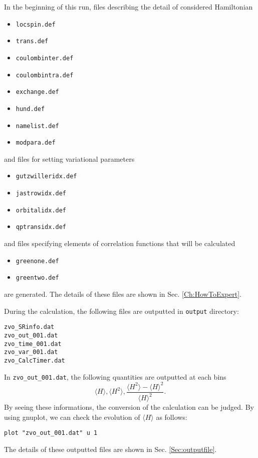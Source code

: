 In the beginning of this run,
files describing the detail of considered Hamiltonian
\begin{itemize}
\item \verb|locspin.def|
\item \verb|trans.def|
\item \verb|coulombinter.def|
\item \verb|coulombintra.def|
\item \verb|exchange.def|
\item \verb|hund.def|
\item \verb|namelist.def|
\item \verb|modpara.def|
\end{itemize}
and files for setting variational parameters
\begin{itemize}
\item \verb|gutzwilleridx.def|
\item \verb|jastrowidx.def|
\item \verb|orbitalidx.def|
\item \verb|qptransidx.def|
\end{itemize}
and files specifying elements of correlation functions
that will be calculated 
\begin{itemize}
\item \verb|greenone.def|
\item \verb|greentwo.def|
\end{itemize}
are generated. The details of these files are shown in Sec. \ref{Ch:HowToExpert}.

During the calculation, the following files are outputted in \verb|output| directory:\\
\begin{minipage}{12cm}
  \begin{screen}
\begin{verbatim}
zvo_SRinfo.dat
zvo_out_001.dat
zvo_time_001.dat
zvo_var_001.dat
zvo_CalcTimer.dat
\end{verbatim}
  \end{screen}
\end{minipage}

In \verb|zvo_out_001.dat|, the following quantities are outputted at each bins  
\begin{equation}
\langle H \rangle, \langle H^2 \rangle, \frac{\langle H^2 \rangle- \langle H \rangle^2 }{\langle H \rangle^2} \nonumber.
\end{equation}
By seeing these informations, the conversion of the calculation can be judged. 
By using gnuplot, we can check the evolution of $\langle H \rangle$ as follows:
\begin{verbatim}
plot "zvo_out_001.dat" u 1
\end{verbatim}
The details of these outputted files are shown in Sec. \ref{Sec:outputfile}.\\

